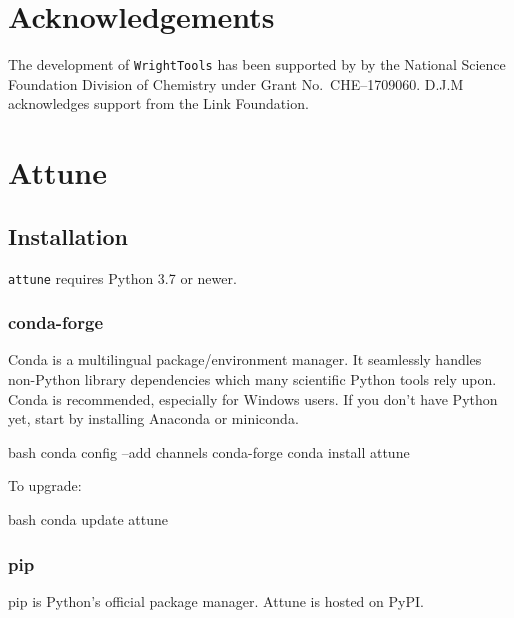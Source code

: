 \hypertarget{acknowledgements}{%
\section{Acknowledgements}\label{acknowledgements}}

The development of \texttt{WrightTools} has been supported by by the
National Science Foundation Division of Chemistry under Grant
No.~CHE--1709060. D.J.M acknowledges support from the Link Foundation.


\section{Attune}  %


\subsection{Installation}\label{install}

\texttt{attune} requires Python 3.7 or newer.

\hypertarget{conda-forge}{%
\subsubsection{conda-forge}\label{conda-forge}}

Conda\cite{conda} is a multilingual
package/environment manager. It seamlessly handles non-Python library
dependencies which many scientific Python tools rely upon. Conda is
recommended, especially for Windows users. If you don't have Python yet,
start by installing Anaconda\cite{anaconda}
or miniconda\cite{miniconda}.

\begin{codefragment}{bash}
conda config --add channels conda-forge
conda install attune
\end{codefragment}

To upgrade:

\begin{codefragment}{bash}
conda update attune
\end{codefragment}

\hypertarget{pip}{%
\subsubsection{pip}\label{pip}}

pip\cite{pip} is Python's official
package manager. Attune is
hosted on PyPI\cite{attune-pypi}.

